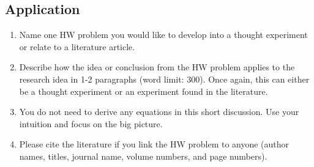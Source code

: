 \documentclass[../psets.tex]{subfiles}
\begin{document}
\subsection*{Application}
\begin{enumerate}[label={\arabic*)}]
    \item Name one HW problem you would like to develop into a thought experiment or relate to a literature article.
    \item Describe how the idea or conclusion from the HW problem applies to the research idea in 1-2 paragraphs (word limit: 300). Once again, this can either be a thought experiment or an experiment found in the literature.
    \item You do not need to derive any equations in this short discussion. Use your intuition and focus on the big picture.
    \item Please cite the literature if you link the HW problem to anyone (author names, titles, journal name, volume numbers, and page numbers).
\end{enumerate}
\setcounter{equation}{0}
\end{document}
